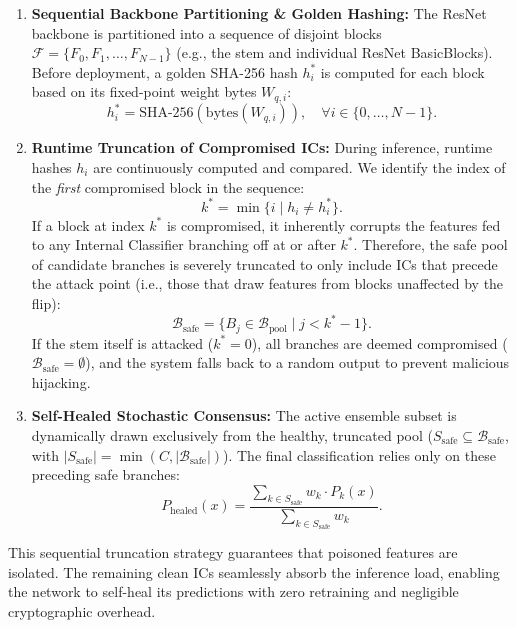 \documentclass[conference]{IEEEtran}
\begin{document}
\begin{enumerate}
    \item \textbf{Sequential Backbone Partitioning \& Golden Hashing:} The ResNet backbone is partitioned into a sequence of disjoint blocks $\mathcal{F} = \{F_0, F_1, \dots, F_{N-1}\}$ (e.g., the stem and individual ResNet BasicBlocks). Before deployment, a golden SHA-256 hash $h_i^*$ is computed for each block based on its fixed-point weight bytes $W_{q, i}$:
    \begin{equation}
        h_i^* = \text{SHA-256}\left(\text{bytes}(W_{q, i})\right), \quad \forall i \in \{0, \dots, N-1\}.
    \end{equation}
    
    \item \textbf{Runtime Truncation of Compromised ICs:} During inference, runtime hashes $h_i$ are continuously computed and compared. We identify the index of the \textit{first} compromised block in the sequence:
    \begin{equation}
        k^* = \min \{ i \mid h_i \neq h_i^* \}.
    \end{equation}
    If a block at index $k^*$ is compromised, it inherently corrupts the features fed to any Internal Classifier branching off at or after $k^*$. Therefore, the safe pool of candidate branches is severely truncated to only include ICs that precede the attack point (i.e., those that draw features from blocks unaffected by the flip):
    \begin{equation}
        \mathcal{B}_{\text{safe}} = \{ B_j \in \mathcal{B}_{\text{pool}} \mid j < k^* - 1 \}.
    \end{equation}
    If the stem itself is attacked ($k^* = 0$), all branches are deemed compromised ($\mathcal{B}_{\text{safe}} = \emptyset$), and the system falls back to a random output to prevent malicious hijacking.
    
    \item \textbf{Self-Healed Stochastic Consensus:} The active ensemble subset is dynamically drawn exclusively from the healthy, truncated pool ($S_{\text{safe}} \subseteq \mathcal{B}_{\text{safe}}$, with $|S_{\text{safe}}| = \min(C, |\mathcal{B}_{\text{safe}}|)$). The final classification relies only on these preceding safe branches:
    \begin{equation}
        P_{\text{healed}}(x) = \frac{\sum_{k \in S_{\text{safe}}} w_k \cdot P_k(x)}{\sum_{k \in S_{\text{safe}}} w_k}.
    \end{equation}
\end{enumerate}
This sequential truncation strategy guarantees that poisoned features are isolated. The remaining clean ICs seamlessly absorb the inference load, enabling the network to self-heal its predictions with zero retraining and negligible cryptographic overhead.
\end{document}
